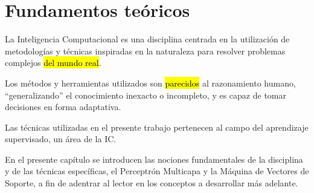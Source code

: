 %
%
%
%
\chapter{Fundamentos teóricos}
%
La Inteligencia Computacional es una disciplina centrada en la
utilización de metodologías y técnicas inspiradas en la naturaleza
para resolver problemas complejos \hl{del mundo real}.

Los métodos y herramientas utilizados son \hl{parecidos} al
razonamiento humano, ``generalizando'' el conocimiento inexacto o
incompleto, y es capaz de tomar decisiones en forma adaptativa.

Las técnicas utilizadas en el presente trabajo pertenecen al campo del
aprendizaje supervisado, un área de la IC.

En el presente capítulo se introducen las nociones fundamentales de la
disciplina y de las técnicas específicas, el Perceptrón Multicapa y la
Máquina de Vectores de Soporte, a fin de adentrar al lector en los
conceptos a desarrollar más adelante.
